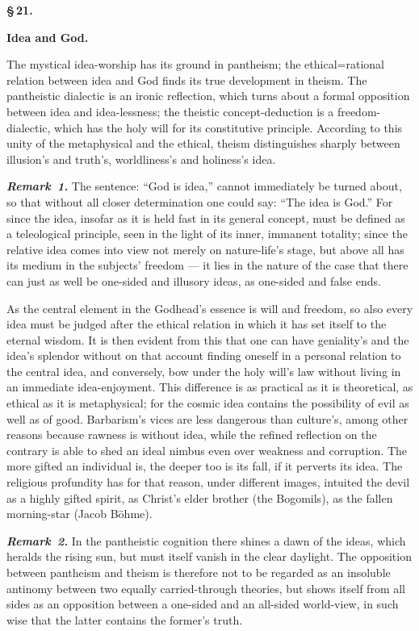 \documentclass[12pt]{book}
\newcommand{\parag}[2]{%
  \par\vspace{0.9\baselineskip}%
  \begin{center}
    {\bfseries \S\,#1.\par}\vspace{0.2\baselineskip}
    {\bfseries #2\par}
  \end{center}
  \vspace{0.25\baselineskip}
  \phantomsection
  \addcontentsline{toc}{subsubsection}{\texorpdfstring{\S\,#1.\quad #2}{§ #1. #2}}%
}
\newcommand{\anm}[1]{\emph{\textbf{Remark~#1.}}}
\begin{document}
\parag{21}{Idea and God.}

The mystical idea-worship has its ground in pantheism; the ethical=rational
relation between idea and God finds its true development in theism. The
pantheistic dialectic is an ironic reflection, which turns about a formal
opposition between idea and idea-lessness; the theistic concept-deduction is
a freedom-dialectic, which has the holy will for its constitutive principle.
According to this unity of the metaphysical and the ethical, theism
distinguishes sharply between illusion's and truth's, worldliness's and
holiness's idea.

\anm{1} The sentence: ``God is idea,'' cannot immediately be turned about,
so that without all closer determination one could say: ``The idea is
God.'' For since the idea, insofar as it is held fast in its general
concept, must be defined as a teleological principle, seen in the light of
its inner, immanent totality; since the relative idea comes into view not
merely on nature-life's stage, but above all has its medium in the subjects'
freedom --- it lies in the nature of the case that there can just as well be
one-sided and illusory ideas, as one-sided and false ends.

As the central element in the Godhead's essence is will and freedom, so also
every idea must be judged after the ethical relation in which it has set
itself to the eternal wisdom. It is then evident from this that one can have
geniality's and the idea's splendor without on that account finding oneself
in a personal relation to the central idea, and conversely, bow under the
holy will's law without living in an immediate idea-enjoyment. This
difference is as practical as it is theoretical, as ethical as it is
metaphysical; for the cosmic idea contains the possibility of evil as well
as of good. Barbarism's vices are less dangerous than culture's, among other
reasons because rawness is without idea, while the refined reflection on the
contrary is able to shed an ideal nimbus even over weakness and corruption.
The more gifted an individual is, the deeper too is its fall, if it perverts
its idea. The religious profundity has for that reason, under different
images, intuited the devil as a highly gifted spirit, as Christ's elder
brother (the Bogomils), as the fallen morning-star (Jacob Böhme).

\anm{2} In the pantheistic cognition there shines a dawn of the ideas, which
heralds the rising sun, but must itself vanish in the clear daylight. The
opposition between pantheism and theism is therefore not to be regarded as
an insoluble antinomy between two equally carried-through theories, but
shows itself from all sides as an opposition between a one-sided and an
all-sided world-view, in such wise that the latter contains the former's
truth.
\end{document}
